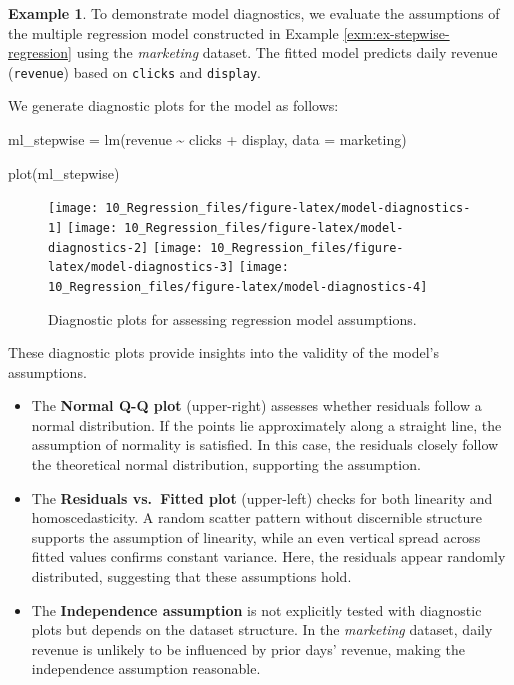 \documentclass[
  11pt,
]{book}
\makeatletter
\newenvironment{Shaded}{}{}
\newcommand{\AttributeTok}[1]{#1}
\newcommand{\FunctionTok}[1]{#1}
\newcommand{\NormalTok}[1]{#1}
\newcommand{\OtherTok}[1]{\textcolor[rgb]{0.39,0.39,0.39}{#1}}
\newcommand{\SpecialCharTok}[1]{\textcolor[rgb]{0.39,0.39,0.39}{#1}}
\providecommand{\tightlist}{%
  \setlength{\itemsep}{0pt}\setlength{\parskip}{0pt}}
\newenvironment{kframe}{%
\medskip{}
\setlength{\fboxsep}{.8em}
 \def\at@end@of@kframe{}%
 \ifinner\ifhmode%
  \def\at@end@of@kframe{\end{minipage}}%
  \begin{minipage}{\columnwidth}%
 \fi\fi%
 \def\FrameCommand##1{\hskip\@totalleftmargin \hskip-\fboxsep
 \colorbox{shadecolor}{##1}\hskip-\fboxsep
     \hskip-\linewidth \hskip-\@totalleftmargin \hskip\columnwidth}%
 \MakeFramed {\advance\hsize-\width
   \@totalleftmargin\z@ \linewidth\hsize
   \@setminipage}}%
 {\par\unskip\endMakeFramed%
 \at@end@of@kframe}
\renewenvironment{Shaded}{\begin{kframe}}{\end{kframe}}
\theoremstyle{definition}
\theoremstyle{definition}
\newtheorem{example}{Example}[chapter]
\theoremstyle{definition}
\theoremstyle{definition}
\theoremstyle{remark}
\makeatother
\begin{document}
\begin{example}
\protect\hypertarget{exm:ex-diagnosing-regression}{}\label{exm:ex-diagnosing-regression}To demonstrate model diagnostics, we evaluate the assumptions of the multiple regression model constructed in Example \ref{exm:ex-stepwise-regression} using the \emph{marketing} dataset. The fitted model predicts daily revenue (\texttt{revenue}) based on \texttt{clicks} and \texttt{display}.

We generate diagnostic plots for the model as follows:

\begin{Shaded}
\begin{Highlighting}[]
\NormalTok{ml\_stepwise }\OtherTok{=} \FunctionTok{lm}\NormalTok{(revenue }\SpecialCharTok{\textasciitilde{}}\NormalTok{ clicks }\SpecialCharTok{+}\NormalTok{ display, }\AttributeTok{data =}\NormalTok{ marketing)}

\FunctionTok{plot}\NormalTok{(ml\_stepwise)  }
\end{Highlighting}
\end{Shaded}

\begin{figure}[H]
\texttt{[image: 10\_Regression\_files/figure-latex/model-diagnostics-1]} \texttt{[image: 10\_Regression\_files/figure-latex/model-diagnostics-2]} \texttt{[image: 10\_Regression\_files/figure-latex/model-diagnostics-3]} \texttt{[image: 10\_Regression\_files/figure-latex/model-diagnostics-4]} \caption{Diagnostic plots for assessing regression model assumptions.}\label{fig:model-diagnostics}
\end{figure}

These diagnostic plots provide insights into the validity of the model's assumptions.

\begin{itemize}
\tightlist
\item
  The \textbf{Normal Q-Q plot} (upper-right) assesses whether residuals follow a normal distribution. If the points lie approximately along a straight line, the assumption of normality is satisfied. In this case, the residuals closely follow the theoretical normal distribution, supporting the assumption.\\
\item
  The \textbf{Residuals vs.~Fitted plot} (upper-left) checks for both linearity and homoscedasticity. A random scatter pattern without discernible structure supports the assumption of linearity, while an even vertical spread across fitted values confirms constant variance. Here, the residuals appear randomly distributed, suggesting that these assumptions hold.\\
\item
  The \textbf{Independence assumption} is not explicitly tested with diagnostic plots but depends on the dataset structure. In the \emph{marketing} dataset, daily revenue is unlikely to be influenced by prior days' revenue, making the independence assumption reasonable.
\end{itemize}


\end{example}
\end{document}
